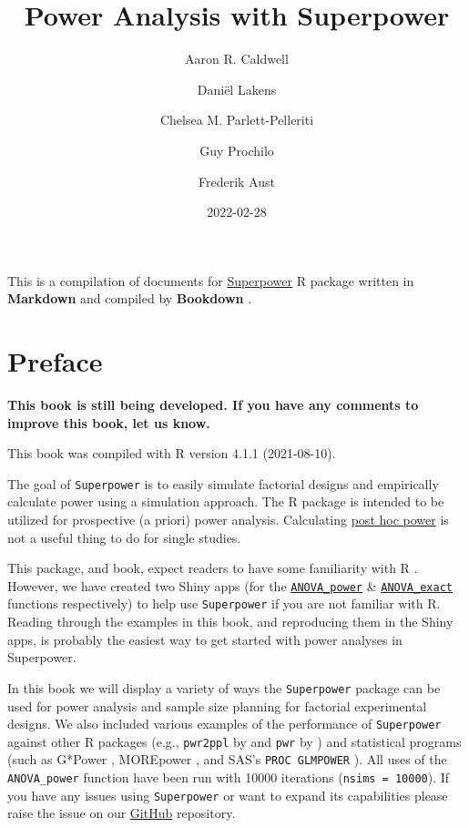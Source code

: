 \documentclass[
]{book}
\title{Power Analysis with Superpower}
\author{Aaron R. Caldwell \and Daniël Lakens \and Chelsea M. Parlett-Pelleriti \and Guy Prochilo \and Frederik Aust}
\date{2022-02-28}
\newenvironment{Shaded}{\begin{snugshade}}{\end{snugshade}}
\begin{document}
\maketitle

{
\setcounter{tocdepth}{1}
\tableofcontents
}
\begin{Shaded}
\begin{Highlighting}[]

\end{Highlighting}
\end{Shaded}

This is a compilation of documents for \href{https://github.com/arcaldwell49/Superpower}{Superpower} R package written in \textbf{Markdown} \citep{R-rmarkdown} and compiled by \textbf{Bookdown} \citep{R-bookdown}.

\hypertarget{preface}{%
\chapter*{Preface}\label{preface}}

\textbf{This book is still being developed. If you have any comments to improve this book, let us know.}

This book was compiled with R version 4.1.1 (2021-08-10).

The goal of \texttt{Superpower} is to easily simulate factorial designs and empirically calculate power using a simulation approach.
The R package is intended to be utilized for prospective (a priori) power analysis. Calculating \href{http://daniellakens.blogspot.com/2014/12/observed-power-and-what-to-do-if-your.html}{post hoc power} is not a useful thing to do for single studies.

This package, and book, expect readers to have some familiarity with R \citeyearpar{R-base}. However, we have created two Shiny apps (for the \href{https://arcaldwell49.github.io/project/shinypowerapp/}{\texttt{ANOVA\_power}} \& \href{https://arcaldwell49.github.io/project/shinyexactapp/}{\texttt{ANOVA\_exact}} functions respectively) to help use \texttt{Superpower} if you are not familiar with R. Reading through the examples in this book, and reproducing them in the Shiny apps, is probably the easiest way to get started with power analyses in Superpower.

In this book we will display a variety of ways the \texttt{Superpower} package can be used for power analysis and sample size planning for factorial experimental designs. We also included various examples of the performance of \texttt{Superpower} against other R packages (e.g., \texttt{pwr2ppl} by \citet{R-pwr2ppl} and \texttt{pwr} by \citet{R-pwr}) and statistical programs (such as G*Power \citet{faul2007g}, MOREpower \citet{Campbell2012MorePower6F}, and SAS's \texttt{PROC\ GLMPOWER} \citeyearpar{SASglmpower}). All uses of the \texttt{ANOVA\_power} function have been run with 10000 iterations (\texttt{nsims\ =\ 10000}). If you have any issues using \texttt{Superpower} or want to expand its capabilities please raise the issue on our \href{https://github.com/arcaldwell49/Superpower/issues}{GitHub} repository.
\end{document}
